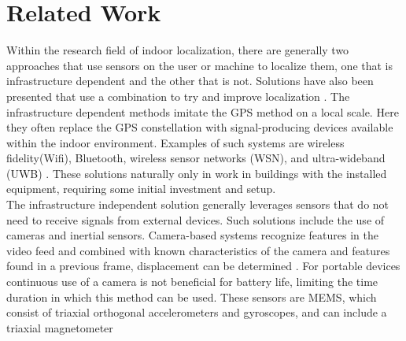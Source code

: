 \chapter{Related Work}

Within the research field of indoor localization, there are generally two approaches that use sensors on the user or machine to localize them, one that is infrastructure dependent and the other that is not. Solutions have also been presented that use a combination to try and improve localization \cite{Gu2019}.
The infrastructure dependent methods imitate the GPS method on a local scale. Here they often replace the GPS constellation with signal-producing devices available within the indoor environment. Examples of such systems are wireless fidelity(Wifi), Bluetooth, wireless sensor networks (WSN), and ultra-wideband (UWB) \cite{Wu2019,Jackermeier2018,Davidson2017}. These solutions naturally only in work in buildings with the installed equipment, requiring some initial investment and setup.\\
The infrastructure independent solution generally leverages sensors that do not need to receive signals from external devices. Such solutions include the use of cameras and inertial sensors. Camera-based systems recognize features in the video feed and combined with known characteristics of the camera and features found in a previous frame, displacement can be determined \cite{Gu2019}. For portable devices continuous use of a camera is not beneficial for battery life, limiting the time duration in which this method can be used. These sensors are \ac{MEMS}, which consist of triaxial orthogonal accelerometers and gyroscopes, and can include a triaxial magnetometer \cite{Yang2014}


